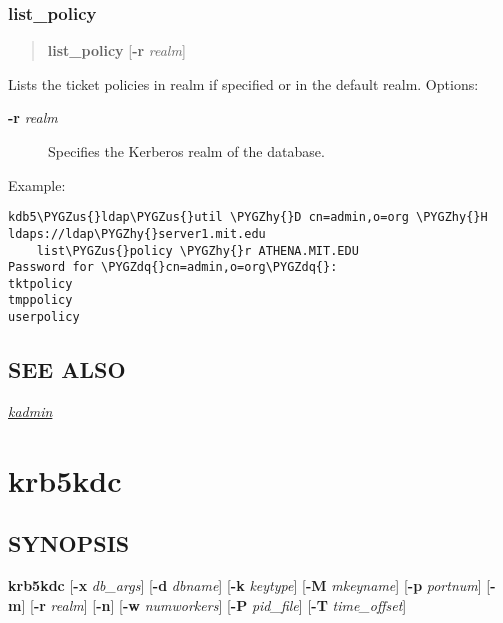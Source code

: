 \documentclass[letterpaper,10pt,english]{sphinxmanual}
\def\PYGZus{\char`\_}
\def\PYGZhy{\char`\-}
\def\PYGZdq{\char`\"}
\begin{document}
\subsubsection{list\_policy}
\label{admin/admin_commands/kdb5_ldap_util:list-policy}\label{admin/admin_commands/kdb5_ldap_util:kdb5-ldap-util-destroy-policy-end}\label{admin/admin_commands/kdb5_ldap_util:kdb5-ldap-util-list-policy}\begin{quote}

\textbf{list\_policy}
{[}\textbf{-r} \emph{realm}{]}
\end{quote}

Lists the ticket policies in realm if specified or in the default
realm.  Options:
\begin{description}
\item[{\textbf{-r} \emph{realm}}] \leavevmode
Specifies the Kerberos realm of the database.

\end{description}

Example:

\begin{Verbatim}[commandchars=\\\{\}]
kdb5\PYGZus{}ldap\PYGZus{}util \PYGZhy{}D cn=admin,o=org \PYGZhy{}H ldaps://ldap\PYGZhy{}server1.mit.edu
    list\PYGZus{}policy \PYGZhy{}r ATHENA.MIT.EDU
Password for \PYGZdq{}cn=admin,o=org\PYGZdq{}:
tktpolicy
tmppolicy
userpolicy
\end{Verbatim}


\subsection{SEE ALSO}
\label{admin/admin_commands/kdb5_ldap_util:see-also}\label{admin/admin_commands/kdb5_ldap_util:kdb5-ldap-util-list-policy-end}
{\hyperref[admin/admin_commands/kadmin_local:kadmin-1]{\emph{kadmin}}}


\section{krb5kdc}
\label{admin/admin_commands/krb5kdc::doc}\label{admin/admin_commands/krb5kdc:krb5kdc-8}\label{admin/admin_commands/krb5kdc:krb5kdc}

\subsection{SYNOPSIS}
\label{admin/admin_commands/krb5kdc:synopsis}
\textbf{krb5kdc}
{[}\textbf{-x} \emph{db\_args}{]}
{[}\textbf{-d} \emph{dbname}{]}
{[}\textbf{-k} \emph{keytype}{]}
{[}\textbf{-M} \emph{mkeyname}{]}
{[}\textbf{-p} \emph{portnum}{]}
{[}\textbf{-m}{]}
{[}\textbf{-r} \emph{realm}{]}
{[}\textbf{-n}{]}
{[}\textbf{-w} \emph{numworkers}{]}
{[}\textbf{-P} \emph{pid\_file}{]}
{[}\textbf{-T} \emph{time\_offset}{]}
\end{document}
